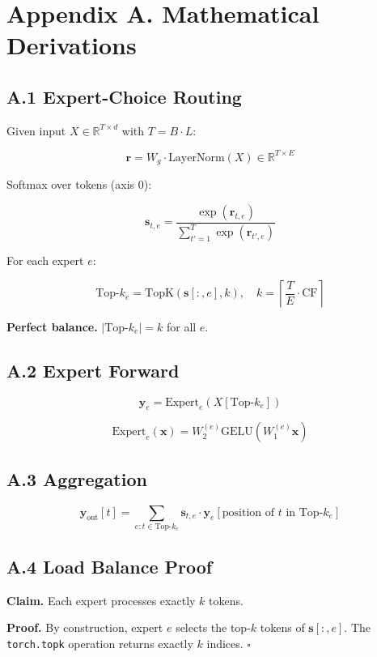 \section{Appendix A. Mathematical Derivations}

\subsection{A.1 Expert-Choice Routing}

Given input $X \in \mathbb{R}^{T \times d}$ with $T = B \cdot L$:

\[
\mathbf{r} = W_g \cdot \text{LayerNorm}(X) \in \mathbb{R}^{T \times E}
\tag{A.1}
\]

Softmax over tokens (axis 0):

\[
\mathbf{s}_{t, e} = \frac{\exp(\mathbf{r}_{t, e})}{\sum_{t'=1}^{T} \exp(\mathbf{r}_{t', e})}
\tag{A.2}
\]

For each expert $e$:

\[
\text{Top-}k_e = \text{TopK}(\mathbf{s}[:, e], k), \quad k = \left\lceil \frac{T}{E} \cdot \text{CF} \right\rceil
\tag{A.3}
\]

\textbf{Perfect balance.} $|\text{Top-}k_e| = k$ for all $e$.

\subsection{A.2 Expert Forward}

\[
\mathbf{y}_e = \text{Expert}_e(X[\text{Top-}k_e])
\tag{A.4}
\]

\[
\text{Expert}_e(\mathbf{x}) = W_2^{(e)} \text{GELU}(W_1^{(e)} \mathbf{x})
\tag{A.5}
\]

\subsection{A.3 Aggregation}

\[
\mathbf{y}_{\text{out}}[t] = \sum_{e : t \in \text{Top-}k_e} \mathbf{s}_{t, e} \cdot \mathbf{y}_e[\text{position of } t \text{ in } \text{Top-}k_e]
\tag{A.6}
\]

\subsection{A.4 Load Balance Proof}

\textbf{Claim.} Each expert processes exactly $k$ tokens.

\textbf{Proof.} By construction, expert $e$ selects the top-$k$ tokens of 
$\mathbf{s}[:, e]$. The \texttt{torch.topk} operation returns exactly $k$ 
indices. $\square$


